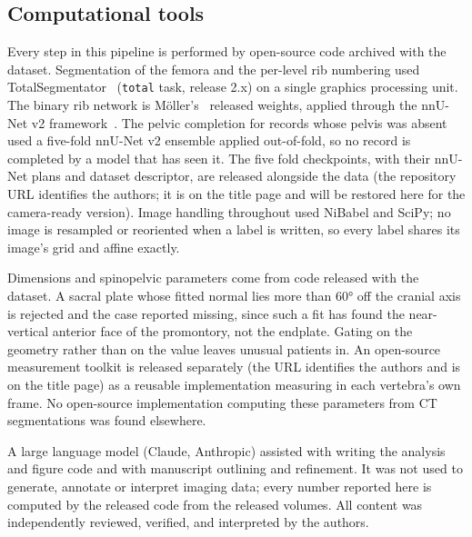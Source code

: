 \documentclass[aapm,mph,amsmath,amssymb,preprint,linenumbers]{revtex4-2}
\newif\ifreview \reviewtrue
\newcommand{\Toolkit}{\ifreview An open-source measurement toolkit\else OpenSpineToolkit, a unit-tested open-source package\fi}
\begin{document}
\subsection{Computational tools}\label{sec:tools}

Every step in this pipeline is performed by open-source code archived with the dataset.
Segmentation of the femora and the per-level rib numbering used TotalSegmentator~\cite{totalsegmentator} (\texttt{total} task,
release 2.x) on a single graphics processing unit. The binary rib network is
M\"oller's~\cite{moller2026} released weights, applied through the nnU-Net v2
framework~\cite{nnunet}. The pelvic completion for records whose pelvis was absent used a five-fold nnU-Net v2 ensemble
applied out-of-fold, so no record is completed by a model that has seen it. The five fold
checkpoints, with their nnU-Net plans and dataset descriptor, are released alongside the
data (\ifreview the repository URL identifies the authors; it is on the title page and will be
restored here for the camera-ready version\else\url{https://huggingface.co/OpenSpineConsortium/spinopelvic-seg-checkpoints}, with the trainer and inference code at \url{https://github.com/OpenSpineConsortium/spinopelvic-seg}\fi). Image handling throughout used NiBabel and SciPy; no image is resampled or reoriented when a
label is written, so every label shares its image's grid and affine exactly.

Dimensions and spinopelvic parameters come from code released with the
dataset. A sacral plate whose fitted normal lies more than 60\si{\degree} off the cranial axis is
rejected and the case reported missing, since such a fit has found the near-vertical anterior
face of the promontory, not the endplate. Gating on the geometry rather than on the
value leaves unusual patients in. \Toolkit{} is released separately
(\ifreview the URL identifies the authors and is on the title page\else\url{https://github.com/OpenSpineConsortium/OpenSpineToolkit}\fi)
as a reusable implementation measuring in each vertebra's own frame. No open-source
implementation computing these parameters from CT segmentations was found elsewhere.

A large language model (Claude, Anthropic) assisted
with writing the analysis and figure code and with manuscript outlining and refinement. It was
not used to generate, annotate or interpret imaging data; every number reported here is computed by the released code from the
released volumes. All content was independently reviewed, verified, and interpreted by the authors.
\end{document}
